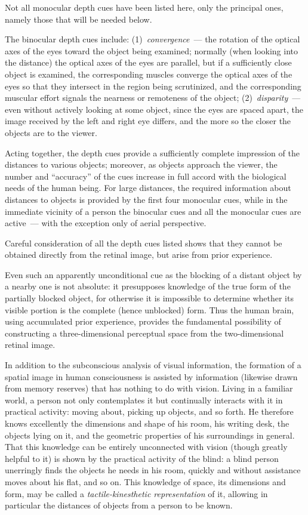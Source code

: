 Not all monocular depth cues have been listed here, only the principal ones, namely
those that will be needed below.

The binocular depth cues include:
(1)~\emph{convergence}~--- the rotation of the optical axes of the eyes toward the object
being examined; normally (when looking into the distance) the optical axes of the eyes
are parallel, but if a sufficiently close object is examined, the corresponding muscles
converge the optical axes of the eyes so that they intersect in the region being
scrutinized, and the corresponding muscular effort signals the nearness or remoteness of
the object;
(2)~\emph{disparity}~--- even without actively looking at some object, since the eyes are
spaced apart, the image received by the left and right eye differs, and the more so the
closer the objects are to the viewer.


Acting together, the depth cues provide a sufficiently complete impression of the
distances to various objects; moreover, as objects approach the viewer, the number and
``accuracy'' of the cues increase in full accord with the biological needs of the human
being.  For large distances, the required information about distances to objects is
provided by the first four monocular cues, while in the immediate vicinity of a person
the binocular cues and all the monocular cues are active~--- with the exception only of
aerial perspective.

Careful consideration of all the depth cues listed shows that they cannot be obtained
directly from the retinal image, but arise from prior experience.

Even such an apparently unconditional cue as the blocking of a distant object by a
nearby one is not absolute: it presupposes knowledge of the true form of the partially
blocked object, for otherwise it is impossible to determine whether its visible portion is
the complete (hence unblocked) form.  Thus the human brain, using accumulated prior
experience, provides the fundamental possibility of constructing a three-dimensional
perceptual space from the two-dimensional retinal image.

In addition to the subconscious analysis of visual information, the formation of a
spatial image in human consciousness is assisted by information (likewise drawn from
memory reserves) that has nothing to do with vision.  Living in a familiar world, a person
not only contemplates it but continually interacts with it in practical activity: moving
about, picking up objects, and so forth.  He therefore knows excellently the dimensions
and shape of his room, his writing desk, the objects lying on it, and the geometric
properties of his surroundings in general.  That this knowledge can be entirely
unconnected with vision (though greatly helpful to it) is shown by the practical activity
of the blind: a blind person unerringly finds the objects he needs in his room, quickly
and without assistance moves about his flat, and so on.  This knowledge of space, its
dimensions and form, may be called a \emph{tactile-kinesthetic representation} of it,
allowing in particular the distances of objects from a person to be known.

